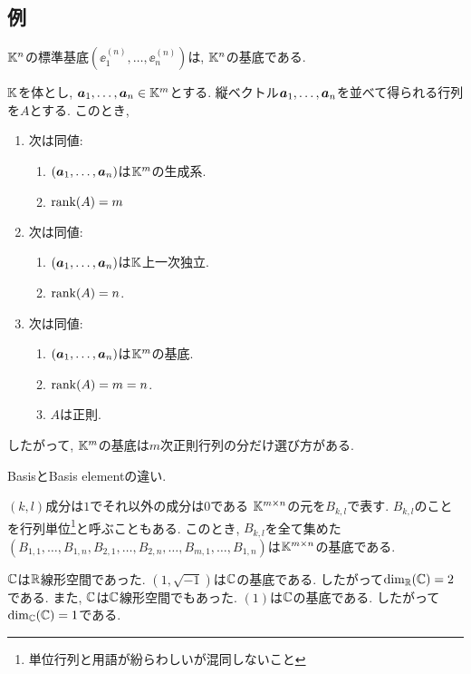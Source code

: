 \subsection{例}
\begin{example}
  $\mathbb{K}^n$の標準基底$(\ee^{(n)}_1,\ldots,\ee^{(n)}_n)$は,
  $\mathbb{K}^n$の基底である.
\end{example}

\begin{example}
$\mathbb{K}$を体とし,
  $\boldsymbol{a}_1,\ldots,\boldsymbol{a}_n\in \mathbb{K}^m$とする.
  縦ベクトル$\boldsymbol{a}_1,\ldots,\boldsymbol{a}_n$を並べて得られる行列を$A$とする.
  このとき,
  \begin{enumerate}
  \item 次は同値:
    \begin{enumerate}
      \item $(\boldsymbol{a}_1,\ldots,\boldsymbol{a}_n)$は$\mathbb{K}^m$の生成系.
      \item $\operatorname{rank}(A)=m$
    \end{enumerate}
  \item 次は同値:
    \begin{enumerate}
      \item $(\boldsymbol{a}_1,\ldots,\boldsymbol{a}_n)$は$\mathbb{K}$上一次独立.
      \item $\operatorname{rank}(A)=n$.
    \end{enumerate}
  \item 次は同値:
    \begin{enumerate}
      \item $(\boldsymbol{a}_1,\ldots,\boldsymbol{a}_n)$は$\mathbb{K}^m$の基底.
      \item $\operatorname{rank}(A)=m=n$.
      \item $A$は正則.
    \end{enumerate}
  \end{enumerate}
したがって,
$\mathbb{K}^m$の基底は$m$次正則行列の分だけ選び方がある.
\end{example}
\begin{remark}
BasisとBasis elementの違い.
\end{remark}


\begin{example}
  $(k,l)$成分は$1$でそれ以外の成分は$0$である
  $\mathbb{K}^{m\times n}$の元を$B_{k,l}$で表す.
  $B_{k,l}$のことを行列単位\footnote{単位行列と用語が紛らわしいが混同しないこと}と呼ぶこともある.
  このとき,
  $B_{k,l}$を全て集めた
  $(B_{1,1},\ldots,B_{1,n},B_{2,1},\ldots,B_{2,n},\ldots,B_{m,1},\ldots,B_{1,n})$は$\mathbb{K}^{m\times n}$の基底である.
\end{example}

\begin{example}
  $\mathbb{C}$は$\mathbb{R}$線形空間であった.
  $(1,\sqrt{-1})$は$\mathbb{C}$の基底である.
  したがって$\dim_{\mathbb{R}}(\mathbb{C}) = 2$である.
  また,
  $\mathbb{C}$は$\mathbb{C}$線形空間でもあった.
  $(1)$は$\mathbb{C}$の基底である.
  したがって$\dim_{\mathbb{C}}(\mathbb{C}) = 1$である.
\end{example}


